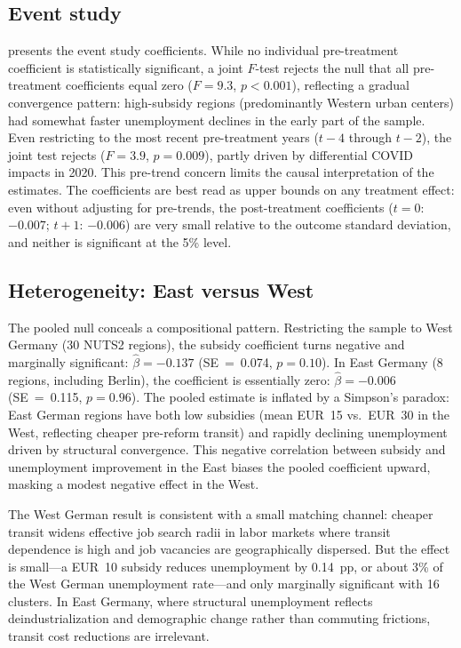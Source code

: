 \documentclass[12pt]{article}
\begin{document}
\subsection{Event study}

 presents the event study coefficients. While no individual pre-treatment coefficient is statistically significant, a joint $F$-test rejects the null that all pre-treatment coefficients equal zero ($F=9.3$, $p<0.001$), reflecting a gradual convergence pattern: high-subsidy regions (predominantly Western urban centers) had somewhat faster unemployment declines in the early part of the sample. Even restricting to the most recent pre-treatment years ($t-4$ through $t-2$), the joint test rejects ($F=3.9$, $p=0.009$), partly driven by differential COVID impacts in 2020.  This pre-trend concern limits the causal interpretation of the estimates. The coefficients are best read as upper bounds on any treatment effect: even without adjusting for pre-trends, the post-treatment coefficients ($t=0$: $-0.007$; $t+1$: $-0.006$) are very small relative to the outcome standard deviation, and neither is significant at the 5\% level.



\subsection{Heterogeneity: East versus West}

The pooled null conceals a compositional pattern. Restricting the sample to West Germany (30 NUTS2 regions), the subsidy coefficient turns negative and marginally significant: $\hat{\beta}=-0.137$ (SE~=~0.074, $p=0.10$). In East Germany (8 regions, including Berlin), the coefficient is essentially zero: $\hat{\beta}=-0.006$ (SE~=~0.115, $p=0.96$). The pooled estimate is inflated by a Simpson's paradox: East German regions have both low subsidies (mean EUR~15 vs.\ EUR~30 in the West, reflecting cheaper pre-reform transit) and rapidly declining unemployment driven by structural convergence. This negative correlation between subsidy and unemployment improvement in the East biases the pooled coefficient upward, masking a modest negative effect in the West.

The West German result is consistent with a small matching channel: cheaper transit widens effective job search radii in labor markets where transit dependence is high and job vacancies are geographically dispersed. But the effect is small---a EUR~10 subsidy reduces unemployment by 0.14~pp, or about 3\% of the West German unemployment rate---and only marginally significant with 16 clusters. In East Germany, where structural unemployment reflects deindustrialization and demographic change rather than commuting frictions, transit cost reductions are irrelevant.
\end{document}
